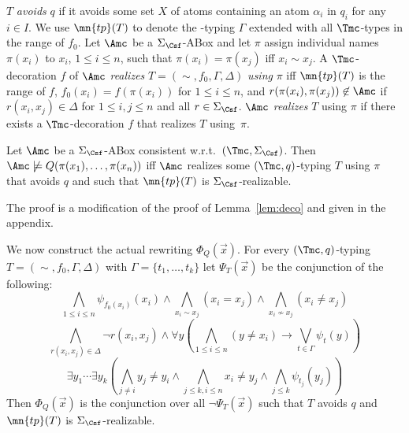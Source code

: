 \documentclass{lmcs}
\theoremstyle{definition}
\begin{document}
  \smallskip
  \noindent
  $T$ \emph{avoids} $q$ if it avoids some set $X$ of
  atoms containing an atom $\alpha_i$ in $q_i$ for any $i\in I$.
  We use $\mn{tp}(T)$ to denote the \Tmc-typing $\Gamma$ extended with all
  $\Tmc$-types in the range of $f_0$.  Let $\Amc$ be a $\Sigma_{\Csf}$-ABox
  and let $\pi$ assign individual names $\pi(x_{i})$ to $x_{i}$,
  $1\leq i \leq n$, such that $\pi(x_{i})=\pi(x_{j})$ iff $x_{i}\sim
  x_{j}$.  A $\Tmc$-decoration $f$ of $\Amc$ \emph{realizes}
  $T=(\sim,f_{0},\Gamma,\Delta)$ \emph{using} $\pi$ iff $\mn{tp}(T)$
  is the range of $f$, $f_{0}(x_{i})=f(\pi(x_{i}))$ for $1\leq i \leq
  n$, and $r(\pi(x_{i}),\pi(x_{j}))\not\in \Amc$ if $r(x_{i},x_{j})\in
  \Delta$ for $1\leq i,j\leq n$ and all $r\in \Sigma_{\Csf}$.  $\Amc$
  \emph{realizes} $T$ using $\pi$ if there exists a $\Tmc$-decoration
  $f$ that realizes $T$ using~$\pi$.

  \begin{lem}
    \label{lem:deco2}
	Let $\Amc$ be a $\Sigma_{\Csf}$-ABox consistent 
	w.r.t.~$(\Tmc,\Sigma_{\Csf})$. Then $\Amc \not\models 
	Q(\pi(x_{1}),\ldots,\pi(x_{n}))$ iff $\Amc$ realizes some 
	$(\Tmc,q)$-typing $T$ using $\pi$ that avoids $q$ and such that 
	$\mn{tp}(T)$ is $\Sigma_{\Csf}$-realizable.
  \end{lem}
The proof is a modification of the proof of Lemma~\ref{lem:deco} and given in the
appendix.

We now construct the actual rewriting $\Phi_{Q}(\vec{x})$. For every
$(\Tmc,q)$-typing $T=(\sim,f_{0},\Gamma,\Delta)$ with
$\Gamma=\{t_{1},\ldots,t_{k}\}$
let $\Psi_{T}(\vec{x})$ be the conjunction of the following:
$$
\bigwedge_{1\leq i \leq n}\psi_{f_0(x_{i})}(x_{i}) \wedge
\bigwedge_{x_{i}\sim x_{j}}(x_{i}=x_{j}) \wedge
\bigwedge_{x_{i}\not\sim x_{j}}(x_{i}\not=x_{j})
$$
$$ 
\bigwedge_{r(x_{i},x_{j})\in \Delta}\neg r(x_{i},x_{j}) \wedge \forall
y (\bigwedge_{1\leq i \leq n}(y \not=x_{i})\rightarrow \bigvee_{t\in
  \Gamma}\psi_{t}(y))
$$
$$ 
\exists y_1\cdots\exists y_k(\bigwedge_{j\neq i} y_j \neq y_i \wedge
\bigwedge_{j\leq k, i\leq n} x_i \neq y_j\wedge \bigwedge_{j \leq k}
\psi_{t_j}(y_j))
$$
Then $\Phi_{Q}(\vec{x})$ is the conjunction over all $\neg
\Psi_{T}(\vec{x})$ such that $T$ avoids $q$ and $\mn{tp}(T)$ is
$\Sigma_{\Csf}$-realizable.
\end{document}
